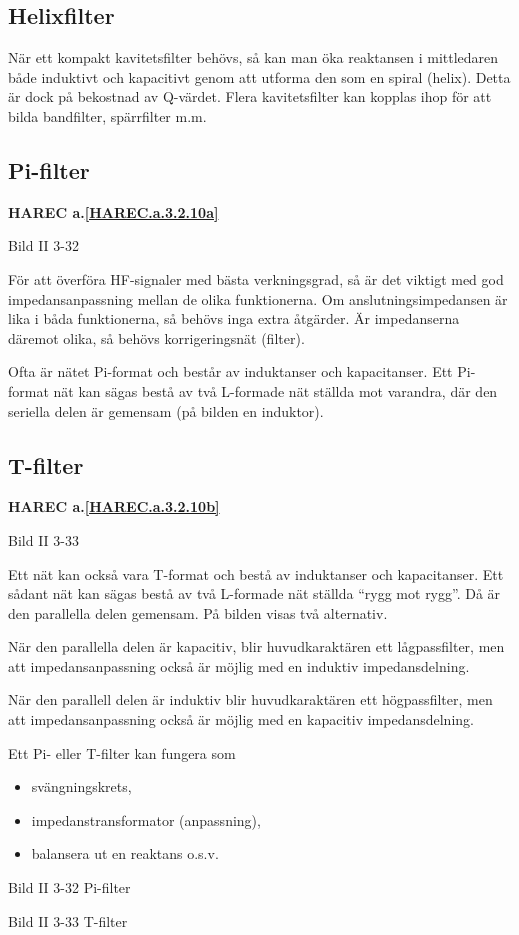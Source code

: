 \subsection{Helixfilter}

När ett kompakt kavitetsfilter behövs, så kan man öka reaktansen i mittledaren
både induktivt och kapacitivt genom att utforma den som en spiral (helix).
Detta är dock på bekostnad av Q-värdet. Flera kavitetsfilter kan kopplas ihop
för att bilda bandfilter, spärrfilter m.m.

\subsection{Pi-filter}
\textbf{HAREC a.\ref{HAREC.a.3.2.10a}\label{myHAREC.a.3.2.10a}}

Bild II 3-32

För att överföra HF-signaler med bästa verkningsgrad, så är det viktigt med god
impedansanpassning mellan de olika funktionerna. Om anslutningsimpedansen är
lika i båda funktionerna, så behövs inga extra åtgärder. Är impedanserna däremot
olika, så behövs korrigeringsnät (filter).

Ofta är nätet Pi-format och består av induktanser och kapacitanser. Ett
Pi-format nät kan sägas bestå av två L-formade nät ställda mot varandra, där
den seriella delen är gemensam (på bilden en induktor).

\subsection{T-filter}
\textbf{HAREC a.\ref{HAREC.a.3.2.10b}\label{myHAREC.a.3.2.10b}}

Bild II 3-33

Ett nät kan också vara T-format och bestå av induktanser och kapacitanser. Ett
sådant nät kan sägas bestå av två L-formade nät ställda ``rygg mot rygg''. Då är
den parallella delen gemensam. På bilden visas två alternativ.

När den parallella delen är kapacitiv, blir huvudkaraktären ett lågpassfilter,
men att impedansanpassning också är möjlig med en induktiv impedansdelning.

När den parallell delen är induktiv blir huvudkaraktären ett högpassfilter, men
att impedansanpassning också är möjlig med en kapacitiv impedansdelning.

Ett Pi- eller T-filter kan fungera som
\begin{itemize}
\item svängningskrets,
\item impedanstransformator (anpassning),
\item balansera ut en reaktans o.s.v.
\end{itemize}

Bild II 3-32 Pi-filter

Bild II 3-33 T-filter
